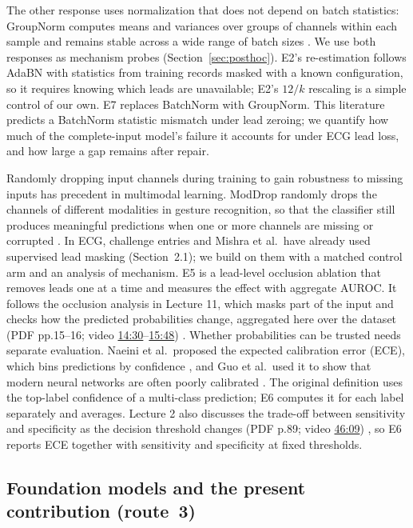 The other response uses normalization that does not depend on batch statistics: GroupNorm computes means and variances over groups of channels within each sample and remains stable across a wide range of batch sizes \citep{wu2018groupnorm}. We use both responses as mechanism probes (Section~\ref{sec:posthoc}). E2's re-estimation follows AdaBN with statistics from training records masked with a known configuration, so it requires knowing which leads are unavailable; E2's $12/k$ rescaling is a simple control of our own. E7 replaces BatchNorm with GroupNorm. This literature predicts a BatchNorm statistic mismatch under lead zeroing; we quantify how much of the complete-input model's failure it accounts for under ECG lead loss, and how large a gap remains after repair.

Randomly dropping input channels during training to gain robustness to missing inputs has precedent in multimodal learning. ModDrop randomly drops the channels of different modalities in gesture recognition, so that the classifier still produces meaningful predictions when one or more channels are missing or corrupted \citep{neverova2016moddrop}. In ECG, challenge entries and Mishra et al.\ have already used supervised lead masking (Section~2.1); we build on them with a matched control arm and an analysis of mechanism. E5 is a lead-level occlusion ablation that removes leads one at a time and measures the effect with aggregate AUROC. It follows the occlusion analysis in Lecture 11, which masks part of the input and checks how the predicted probabilities change, aggregated here over the dataset (PDF pp.15--16; video \href{https://youtu.be/DDU159QXVzI?t=870}{14:30}--\href{https://youtu.be/DDU159QXVzI?t=948}{15:48}) \citep{md6329lecture11}. Whether probabilities can be trusted needs separate evaluation. Naeini et al.\ proposed the expected calibration error (ECE), which bins predictions by confidence \citep{naeini2015ece}, and Guo et al.\ used it to show that modern neural networks are often poorly calibrated \citep{guo2017calibration}. The original definition uses the top-label confidence of a multi-class prediction; E6 computes it for each label separately and averages. Lecture 2 also discusses the trade-off between sensitivity and specificity as the decision threshold changes (PDF p.89; video \href{https://youtu.be/Ki2h4rNHuSk?t=2769}{46:09}) \citep{md6329lecture02}, so E6 reports ECE together with sensitivity and specificity at fixed thresholds.

\subsection{Foundation models and the present contribution (route~3)}

